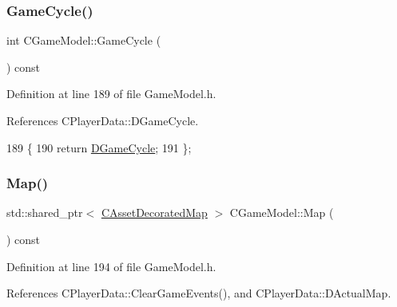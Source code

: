 \subsubsection{\texorpdfstring{Game\+Cycle()}{GameCycle()}}
{\footnotesize\ttfamily int C\+Game\+Model\+::\+Game\+Cycle (\begin{DoxyParamCaption}{ }\end{DoxyParamCaption}) const\hspace{0.3cm}{\ttfamily [inline]}}



Definition at line 189 of file Game\+Model.\+h.



References C\+Player\+Data\+::\+D\+Game\+Cycle.


\begin{DoxyCode}
189                              \{
190             \textcolor{keywordflow}{return} \hyperlink{classCGameModel_a80bf86a6c1d75229d5d0f441f6313a1c}{DGameCycle};
191         \};
\end{DoxyCode}
\hypertarget{classCGameModel_a7b95d8fb5d96d3dd9ad3596e1a90f6a3}{}\label{classCGameModel_a7b95d8fb5d96d3dd9ad3596e1a90f6a3} 
\subsubsection{\texorpdfstring{Map()}{Map()}}
{\footnotesize\ttfamily std\+::shared\+\_\+ptr$<$ \hyperlink{classCAssetDecoratedMap}{C\+Asset\+Decorated\+Map} $>$ C\+Game\+Model\+::\+Map (\begin{DoxyParamCaption}{ }\end{DoxyParamCaption}) const\hspace{0.3cm}{\ttfamily [inline]}}



Definition at line 194 of file Game\+Model.\+h.



References C\+Player\+Data\+::\+Clear\+Game\+Events(), and C\+Player\+Data\+::\+D\+Actual\+Map.


